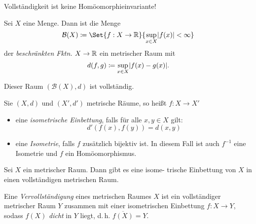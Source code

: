 \documentclass{cheat-sheet}
\begin{document}

\begin{acht}
  Vollständigkeit ist keine Homöomorphieinvariante!
\end{acht}

\begin{defn}
  Sei $X$ eine Menge. Dann ist die Menge
  \[ \mathcal{B}(X) \coloneqq \Set{ f : X \to \R }{ \sup_{x \in X} \abs{f(x)} < \infty } \]
  der \emph{beschränkten Fktn.} $X \to \mathbb{R}$ ein metrischer Raum mit
  \[ d(f, g) \coloneqq \sup_{x \in X} \lvert f(x) - g(x)\rvert. \]
\end{defn}

\begin{prop}
  Dieser Raum $(\mathcal{B}(X), d)$ ist vollständig.
\end{prop}

\begin{defn}
  Sie $(X, d)$ und $(X', d')$ metrische Räume, so heißt $f : X \to X'$
  \begin{itemize}
    \item eine \emph{isometrische Einbettung}, falls für alle $x , y \in X$ gilt:
    \[ d'(f(x), f(y)) = d(x, y) \]
    \item eine \emph{Isometrie}, falls $f$ zusätzlich bijektiv ist. In diesem Fall ist auch $f^{-1}$ eine Isometrie und $f$ ein Homöomorphismus.
  \end{itemize}
\end{defn}

\begin{prop}
  Sei $X$ ein metrischer Raum. Dann gibt es eine isome- trische Einbettung von $X$ in einen vollständigen metrischen Raum.
\end{prop}


\begin{defn}
  Eine \emph{Vervollständigung} eines metrischen Raumes $X$ ist ein vollständiger metrischer Raum $Y$ zusammen mit einer isometrischen Einbettung $f : X \to Y$, sodass $f(X)$ \emph{dicht}  in $Y$ liegt, d.\,h. $\overline{f(X)} = Y$.
\end{defn}
\end{document}
